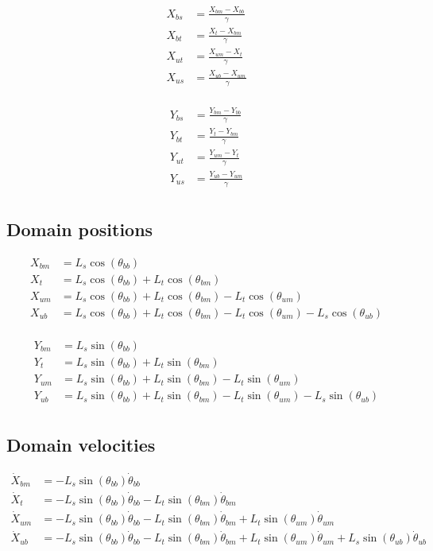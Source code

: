 \documentclass[11pt,twocolumn]{article}
\begin{document}
\begin{align*}
X_{bs} &= \frac{X_{bm} - X_{bb}}{\gamma}\\
X_{bt} &= \frac{X_{t} - X_{bm}}{\gamma}\\
X_{ut} &= \frac{X_{um} - X_{t}}{\gamma}\\
X_{us} &= \frac{X_{ub} - X_{um}}{\gamma}\\
\end{align*}

\begin{align*}
Y_{bs} &= \frac{Y_{bm} - Y_{bb}}{\gamma}\\
Y_{bt} &= \frac{Y_{t} - Y_{bm}}{\gamma}\\
Y_{ut} &= \frac{Y_{um} - Y_{t}}{\gamma}\\
Y_{us} &= \frac{Y_{ub} - Y_{um}}{\gamma}\\
\end{align*}

\subsection{Domain positions}
\begin{align*}
X_{bm} &= L_s\cos(\theta_{bb})\\
X_{t } &= L_s\cos(\theta_{bb}) + L_t\cos(\theta_{bm})\\
X_{um} &= L_s\cos(\theta_{bb}) + L_t\cos(\theta_{bm}) - L_t\cos(\theta_{um})\\
X_{ub} &= L_s\cos(\theta_{bb}) + L_t\cos(\theta_{bm}) - L_t\cos(\theta_{um}) - L_s\cos(\theta_{ub})\\
\end{align*}

\begin{align*}
Y_{bm} &= L_s\sin(\theta_{bb})\\
Y_{t } &= L_s\sin(\theta_{bb}) + L_t\sin(\theta_{bm})\\
Y_{um} &= L_s\sin(\theta_{bb}) + L_t\sin(\theta_{bm}) - L_t\sin(\theta_{um})\\
Y_{ub} &= L_s\sin(\theta_{bb}) + L_t\sin(\theta_{bm}) - L_t\sin(\theta_{um}) - L_s\sin(\theta_{ub})\\
\end{align*}

\subsection{Domain velocities}
\begin{align*}
\dot{X}_{bm} &= -L_s\sin(\theta_{bb})\dot{\theta}_{bb}\\
\dot{X}_{t } &= -L_s\sin(\theta_{bb})\dot{\theta}_{bb} - L_t\sin(\theta_{bm})\dot{\theta}_{bm}\\
\dot{X}_{um} &= -L_s\sin(\theta_{bb})\dot{\theta}_{bb} - L_t\sin(\theta_{bm})\dot{\theta}_{bm} + L_t\sin(\theta_{um})\dot{\theta}_{um}\\
\dot{X}_{ub} &= -L_s\sin(\theta_{bb})\dot{\theta}_{bb} - L_t\sin(\theta_{bm})\dot{\theta}_{bm} + L_t\sin(\theta_{um})\dot{\theta}_{um} + L_s\sin(\theta_{ub})\dot{\theta}_{ub}\\
\end{align*}
\end{document}
